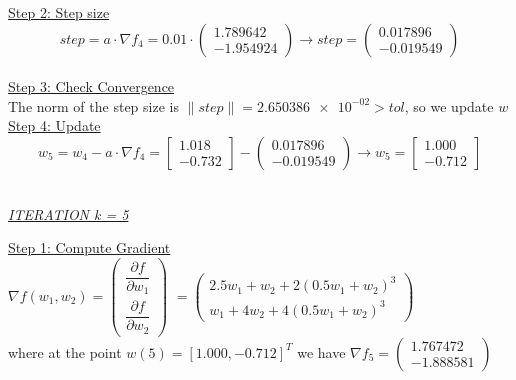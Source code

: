 \underline{Step 2: Step size}
\[
step = a \cdot \nabla f_{4} = 0.01 \cdot \left(\begin{array}{c}
	1.789642 \\
-1.954924
\end{array}\right) \rightarrow step =\left(\begin{array}{c}
	0.017896 \\
	-0.019549
\end{array}\right)
\]
\\[4mm]

\underline{Step 3: Check Convergence}\\
The norm of the step size is $\| step \| = \num{2.650386e-02} > tol$, so we update $w$
\\[4mm]

\underline{Step 4: Update}
\[ 
w_5 = w_4 - a\cdot \nabla f_4 =  \left[\begin{array}{c}
	1.018\\
	-0.732
\end{array}\right] - \left(\begin{array}{c}
	0.017896 \\
-0.019549
\end{array}\right) \rightarrow
w_5 = \left[\begin{array}{c}
	1.000\\
	-0.712
\end{array}\right]
\]
\\[4mm]

\begin{center}
	\underline{\textit{ITERATION k = 5}}
\end{center}

\underline{Step 1: Compute Gradient}\\
\(\nabla f(w_1,w_2) = \left(\begin{array}{c}
	\dfrac{\partial f}{\partial w_1} \\[4mm]
	\dfrac{\partial f}{\partial w_2}
\end{array}\right)\) $= \left(\begin{array}{c}
	2.5w_1 + w_2 + 2(0.5w_1+w_2)^3\\[1mm]
	w_1 + 4w_2 + 4(0.5w_1+w_2)^3
\end{array}\right)$ \\[3mm]

where at the point $w\left(5\right) = \left[1.000, -0.712\right]^T$ we have $\nabla f_{5} = \left(\begin{array}{c}
	1.767472 \\
	-1.888581
\end{array}\right)$
\\[4mm]

